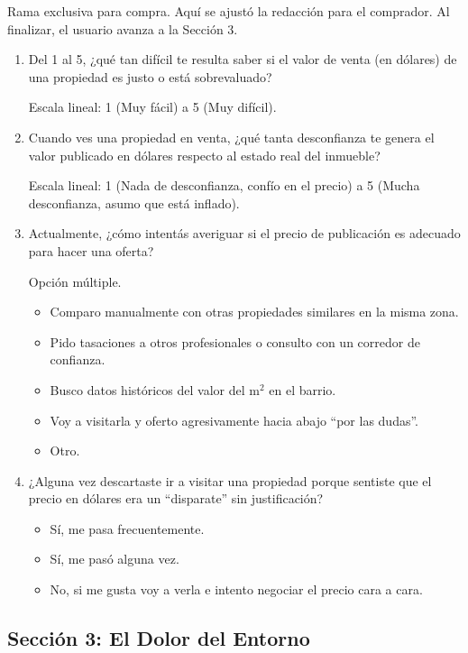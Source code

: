 Rama exclusiva para compra. Aquí se ajustó la redacción para el comprador. Al finalizar, el usuario avanza a la Sección 3.

\begin{enumerate}[label=\textbf{Q\arabic*:}, leftmargin=*, start=7]
\item Del 1 al 5, ¿qué tan difícil te resulta saber si el valor de venta (en dólares) de una propiedad es justo o está sobrevaluado?

Escala lineal: 1 (Muy fácil) a 5 (Muy difícil).

\item Cuando ves una propiedad en venta, ¿qué tanta desconfianza te genera el valor publicado en dólares respecto al estado real del inmueble?

Escala lineal: 1 (Nada de desconfianza, confío en el precio) a 5 (Mucha desconfianza, asumo que está inflado).

\item Actualmente, ¿cómo intentás averiguar si el precio de publicación es adecuado para hacer una oferta?

Opción múltiple.

\begin{itemize}
\item Comparo manualmente con otras propiedades similares en la misma zona.
\item Pido tasaciones a otros profesionales o consulto con un corredor de confianza.
\item Busco datos históricos del valor del m$^2$ en el barrio.
\item Voy a visitarla y oferto agresivamente hacia abajo ``por las dudas''.
\item Otro.
\end{itemize}

\item ¿Alguna vez descartaste ir a visitar una propiedad porque sentiste que el precio en dólares era un ``disparate'' sin justificación?

\begin{itemize}
\item Sí, me pasa frecuentemente.
\item Sí, me pasó alguna vez.
\item No, si me gusta voy a verla e intento negociar el precio cara a cara.
\end{itemize}
\end{enumerate}

\subsection{Sección 3: El Dolor del Entorno}

